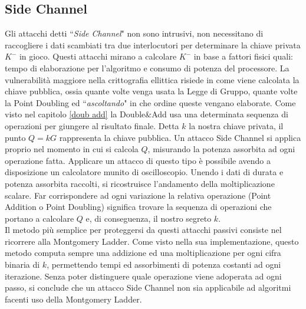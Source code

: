 \documentclass[a4paper,12pt]{tesiinfo}
\begin{document}
\subsection{Side Channel}
Gli attacchi detti ``\textit{Side Channel}" non sono intrusivi, non necessitano di raccogliere i dati scambiati tra due interlocutori per determinare la chiave privata $K^-$ in gioco. Questi attacchi mirano a calcolare $K^-$ in base a fattori fisici quali: tempo di elaborazione per l'algoritmo e consumo di potenza del processore. La vulnerabilit\`a maggiore nella crittografia ellittica risiede in come viene calcolata la chiave pubblica, ossia quante volte venga usata la Legge di Gruppo, quante volte la Point Doubling ed ``\textit{ascoltando}" in che ordine queste vengano elaborate. Come visto nel capitolo \ref{doub add} la Double\&Add usa una determinata sequenza di operazioni per giungere al risultato finale. Detta $k$ la nostra chiave privata, il punto $Q=kG$ rappresenta la chiave pubblica. Un attacco Side Channel si applica proprio nel momento in cui si calcola $Q$, misurando la potenza assorbita ad ogni operazione fatta. Applicare un attacco di questo tipo \`e possibile avendo a disposizione un calcolatore munito di oscilloscopio. Unendo i dati di durata e potenza assorbita raccolti, si ricostruisce l'andamento della moltiplicazione scalare. Far corrispondere ad ogni variazione la relativa operazione (Point Addition o Point Doubling) significa trovare la sequenza di operazioni che portano a calcolare $Q$ e, di conseguenza, il nostro segreto $k$.
\\
Il metodo pi\`u semplice per proteggersi da questi attacchi passivi consiste nel ricorrere alla Montgomery Ladder. Come visto nella sua implementazione, questo metodo computa sempre una addizione ed una moltiplicazione per ogni cifra binaria di $k$, permettendo tempi ed assorbimenti di potenza costanti ad ogni iterazione. Senza poter distinguere quale operazione viene adoperata ad ogni passo, si conclude che un attacco Side Channel non sia applicabile ad algoritmi facenti uso della Montgomery Ladder.
%
%
%
%
%
%
%
%
%
%
%
%
%
%
%
%
\end{document}
